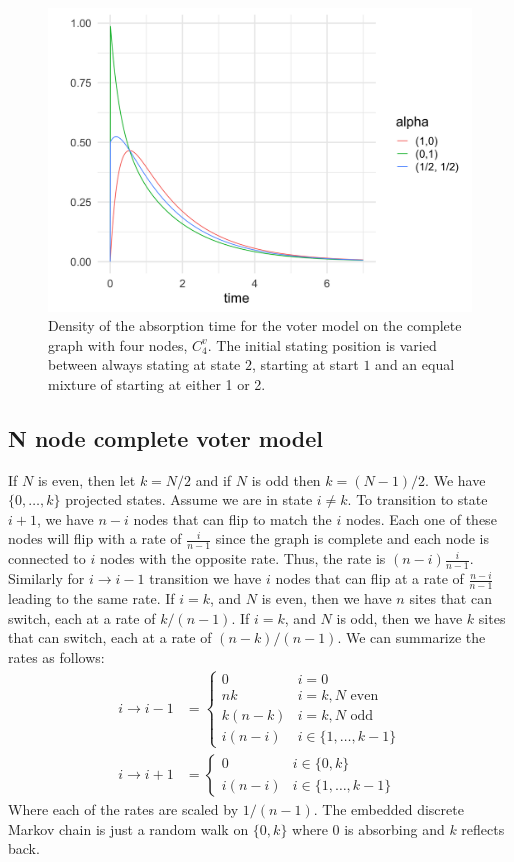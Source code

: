\begin{figure}[H]
  \centering
    \includegraphics[width=.80\textwidth]{figures/voter_density_c4.png}
   \caption{Density of the absorption time for the voter model on the complete graph with four nodes, $C^{v}_4$. The initial stating position is varied between always stating at state $2$, starting at start $1$ and an equal mixture of starting at either 1 or 2.}
  \label{fig:voter_density_c4}
\end{figure}

\subsection{N node complete voter model}
If $N$ is even, then let $k = N / 2$ and if $N$ is odd then $k = (N - 1)/2$.
We have $\{0,\ldots, k\}$ projected states.
Assume we are in state $i \not = k$.
To transition to state $i + 1$, we have $n - i$ nodes that can flip to match the $i$ nodes.
Each one of these nodes will flip with a rate of $\frac{i}{n - 1}$ since the graph is complete and each node is connected to $i$ nodes with the opposite rate.
Thus, the rate is $(n - i) \frac{i}{n - 1}$.
Similarly for $i \to i - 1$ transition we have $i$ nodes that can flip at a rate of $\frac{n - i}{n - 1}$ leading to the same rate.
If $i = k$, and $N$ is even, then we have $n$ sites that can switch, each at a rate of $k / (n - 1)$.
If $i = k$, and $N$ is odd, then we have $k$ sites that can switch, each at a rate of $(n - k ) / (n - 1)$.
We can summarize the rates as follows:
\begin{align*}
    i \to i - 1 &= \begin{cases}
        0 & i = 0\\
        nk & i = k, N \text{ even}\\
        k (n - k) & i = k, N \text{ odd}\\
        i (n - i) & i \in \{1,\ldots, k - 1\}
    \end{cases}\\
    i \to i + 1 &= \begin{cases}
        0 & i \in \{0, k\}\\
        i (n - i) & i \in \{1,\ldots, k - 1\}
    \end{cases}
\end{align*}
Where each of the rates are scaled by $1/(n - 1)$.
The embedded discrete Markov chain is just a random walk on $\{0, k\}$ where 0 is absorbing and $k$ reflects back.

